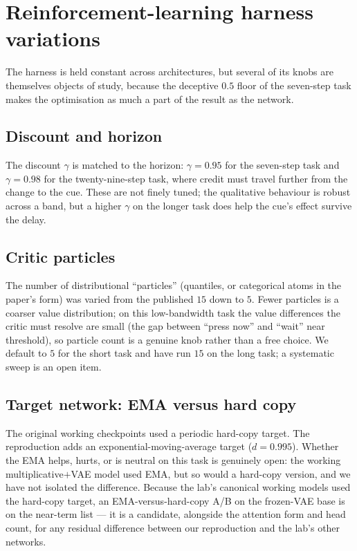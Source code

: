 \chapter{Reinforcement-learning harness variations}
\label{ch:harnessvar}

The harness is held constant across architectures, but several of its knobs are
themselves objects of study, because the deceptive $0.5$ floor of the seven-step task makes
the optimisation as much a part of the result as the network.

\section{Discount and horizon}
The discount $\gamma$ is matched to the horizon: $\gamma=0.95$ for the seven-step task and
$\gamma=0.98$ for the twenty-nine-step task, where credit must travel further from the
change to the cue. These are not finely tuned; the qualitative behaviour is robust across a
band, but a higher $\gamma$ on the longer task does help the cue's effect survive the delay.

\section{Critic particles}
The number of distributional ``particles'' (quantiles, or categorical atoms in the paper's
form) was varied from the published $15$ down to $5$. Fewer particles is a coarser value
distribution; on this low-bandwidth task the value differences the critic must resolve are
small (the gap between ``press now'' and ``wait'' near threshold), so particle count is a
genuine knob rather than a free choice. We default to $5$ for the short task and have run
$15$ on the long task; a systematic sweep is an open item.

\section{Target network: EMA versus hard copy}
The original working checkpoints used a periodic hard-copy target. The reproduction adds an
exponential-moving-average target ($d=0.995$). Whether the EMA helps, hurts, or is neutral
on this task is genuinely open: the working multiplicative$+$VAE model used EMA, but so
would a hard-copy version, and we have not isolated the difference. Because the lab's
canonical working models used the hard-copy target, an EMA-versus-hard-copy A/B on the
frozen-VAE base is on the near-term list --- it is a candidate, alongside the attention form
and head count, for any residual difference between our reproduction and the lab's other
networks.

